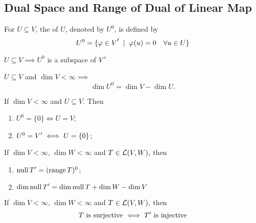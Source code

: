 \subsection{Dual Space and Range of Dual of Linear Map}

\begin{mydef} [annihilator, $U^0$]
  \label{def: annihiltator}
  For $U \subseteq V$, the  of $U$, denoted by $U^{0}$, is defined by
  \begin{equation}
    U^0 = \{ \varphi \in \dual{V} \; \mid \; \varphi (u) = 0 \quad \forall u \in U \}
  \end{equation}
\end{mydef}

\setcounter{thm}{123}
\begin{thm}
  \label{thm: the annihilator is a subspace}
  $U \subseteq V \implies U^{0}$ is a subspace of $\dual{V}$
\end{thm}

\setcounter{thm}{124}
\begin{thm} 
    $U\subseteq V$ and $\dim V < \infty \implies$
    \begin{equation}
      \dim U^0 = \dim V - \dim U.
    \end{equation}
\end{thm}

\setcounter{thm}{126}
\begin{thm} 
  If $\dim V < \infty$ and $U\subseteq V$. Then
  \begin{enumerate}
    \item $U^0 = \{0 \} \iff U = V$;
    \item $U^0 = \dual{V} \iff U = \{0\}$;
   \end{enumerate}
\end{thm}

\begin{thm}
  If $\dim V < \infty$, $\dim W<\infty$ and $T \in \mathcal{L} (V,W),$ then
  \begin{enumerate}
    \item $\mynull \dual{T} = (\myrange T)^0$;
    \item $\dim \mynull \dual{T} = \dim \mynull T + \dim W - \dim V$
  \end{enumerate} 
\end{thm}

\begin{thm}
    If $\dim V < \infty$, $\dim W<\infty$ and $T \in \mathcal{L} (V,W),$ then
  \begin{equation}
    T$ is surjective $ \iff \dual{T} $ is injective$
  \end{equation}
\end{thm}

